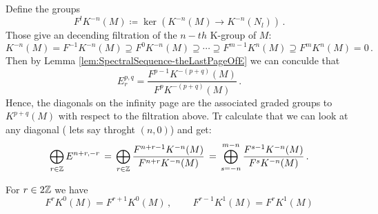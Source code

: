 \begin{definition}\label{cor:spectralsequence-associatedGradedGroupAtInfinityOfE}
	Define the groups
	\begin{equation*}
		F^lK^{-n}(M)\coloneq \ker\left(K^{-n}(M)\to K^{-n}(N_l)\right)\,.
	\end{equation*} Those give an decending filtration of the $n-th$ K-group of $M$:
	\begin{equation*}
		K^{-n}(M)=F^{-1}K^{-n}(M)\supseteq F^{0}K^{-n}(M)\supseteq \cdots \supseteq F^{m-1}K^n(M)\supseteq F^{m}K^n(M)=0\,.
	\end{equation*}
	Then by Lemma \ref{lem:SpectralSequence-theLastPageOfE} we can conculde that
	\begin{equation*}
		E^{p,q}_r=\frac{F^{p-1}K^{-(p+q)}(M)}{F^pK^{-(p+q)}(M)}\,.
	\end{equation*} Hence, the diagonals on the infinity page are the associated graded groups to $K^{p+q}(M)$ with respect to the filtration above. Tr calculate that we can look at any diagonal ( lets say throght $(n,0)$) and get:
	\begin{equation*}
		\bigoplus_{r\in \mathbb{Z}}E^{n+r,-r}\,=\,\bigoplus_{r\in \mathbb{Z}}\frac{F^{n+r-1}K^{-n}(M)}{F^{n+r}K^{-n}(M)}\,=\,\bigoplus_{s=-n}^{m-n}\frac{F^{s-1}K^{-n}(M)}{F^{s}K^{-n}(M)}\,.
	\end{equation*}
\end{definition}
\begin{proposition}
	For $r\in 2\mathbb{Z}$ we have
	\begin{equation*}
		F^rK^0(M)=F^{r+1}K^0(M)\,,\qquad\,
		F^{r-1}K^1(M)=F^{r}K^1(M)
	\end{equation*}
\end{proposition}
